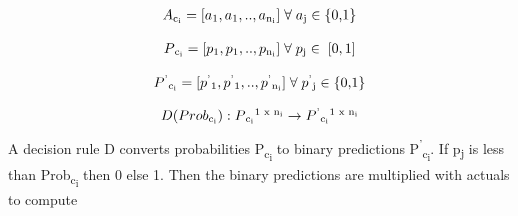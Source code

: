   \begin{equation}
    \begin{array}{l}
      A\textsubscript{c\textsubscript{i}} = [a\textsubscript{1}, a\textsubscript{1}, .., a\textsubscript{n\textsubscript{i}}] 
       \; \forall \; a\textsubscript{j} \in \; $\{0,1\}$
    \end{array}
    \label{eqn:Precision}
  \end{equation}

  \begin{equation}
    \begin{array}{l}
      P\textsubscript{c\textsubscript{i}} = [p\textsubscript{1}, p\textsubscript{1}, .., p\textsubscript{n\textsubscript{i}}]
      \; \forall \; p\textsubscript{j} \in \; [0,1]
    \end{array}
    \label{eqn:Precision}
  \end{equation}

  \begin{equation}
    \begin{array}{l}
      P\textsuperscript{'}\textsubscript{c\textsubscript{i}} = [p\textsuperscript{'}\textsubscript{1}, 
      p\textsuperscript{'}\textsubscript{1}, .., p\textsuperscript{'}\textsubscript{n\textsubscript{i}}]\; 
      \forall \; p\textsuperscript{'}\textsubscript{j} \in \; $\{0,1\}$
    \end{array}
    \label{eqn:Precision}
  \end{equation}

  \begin{equation}
    \begin{array}{l}
      D(Prob\textsubscript{c\textsubscript{i}}) : P\textsubscript{c\textsubscript{i}}\textsuperscript{1 x n\textsubscript{i}}
      \to P\textsuperscript{'}\textsubscript{c\textsubscript{i}}\textsuperscript{1 x n\textsubscript{i}}
    \end{array}
    \label{eqn:Precision}
  \end{equation}
A decision rule D converts probabilities 
P\textsubscript{c\textsubscript{i}}
to binary predictions P\textsuperscript{'}\textsubscript{c\textsubscript{i}}.
If p\textsubscript{j} is less than Prob\textsubscript{c\textsubscript{i}} then 0 else 1.
Then the binary predictions are multiplied with actuals to compute 

